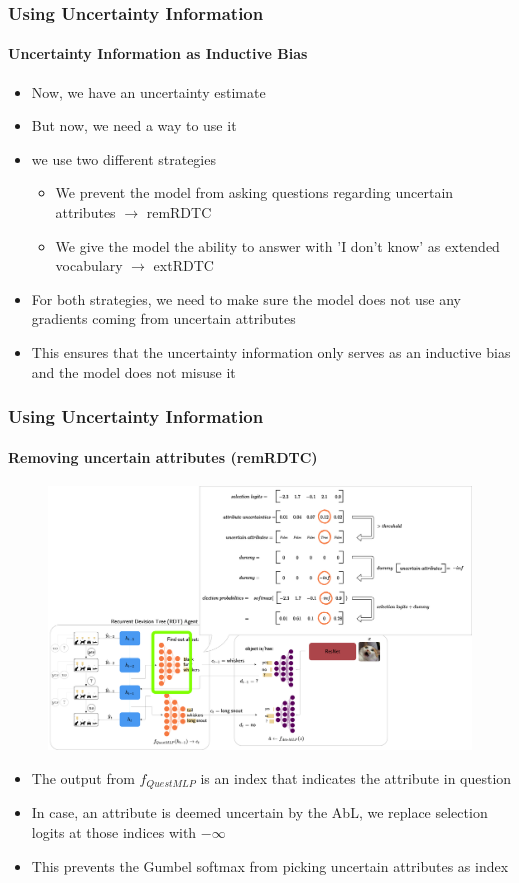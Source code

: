 \documentclass[9pt]{beamer}
\begin{document}
\begin{frame}	
\frametitle{Using Uncertainty Information}
\framesubtitle{Uncertainty Information as Inductive Bias}
\begin{itemize}
	\item Now, we have an uncertainty estimate
	\item But now, we need a way to use it
	\item we use two different strategies
	\begin{itemize}
		\item We prevent the model from asking questions regarding uncertain attributes $\rightarrow$ remRDTC
		\item We give the model the ability to answer with 'I don't know' as extended vocabulary $\rightarrow$ extRDTC
	\end{itemize}
	\item For both strategies, we need to make sure the model does not use any gradients coming from uncertain attributes
	\item This ensures that the uncertainty information only serves as an inductive bias and the model does not misuse it
\end{itemize}
\end{frame}


\begin{frame}
\frametitle{Using Uncertainty Information}
\framesubtitle{Removing uncertain attributes (remRDTC)}
\begin{figure}
	\includegraphics[width=0.8\linewidth]{images/how_to_remRDTC.pdf}
\end{figure}
\begin{itemize}
	\item The output from $f_{QuestMLP}$ is an index that indicates the attribute in question
	\item In case, an attribute is deemed uncertain by the AbL, we replace selection logits at those indices with $-\infty$
	\item This prevents the Gumbel softmax from picking uncertain attributes as index
\end{itemize}
\end{frame}
\end{document}
